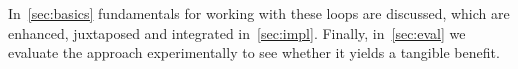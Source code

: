 In~\cref{sec:basics} fundamentals for working with these loops are discussed, which are enhanced, juxtaposed and integrated in~\cref{sec:impl}.
Finally, in~\cref{sec:eval} we evaluate the approach experimentally to see whether it yields a tangible benefit.




